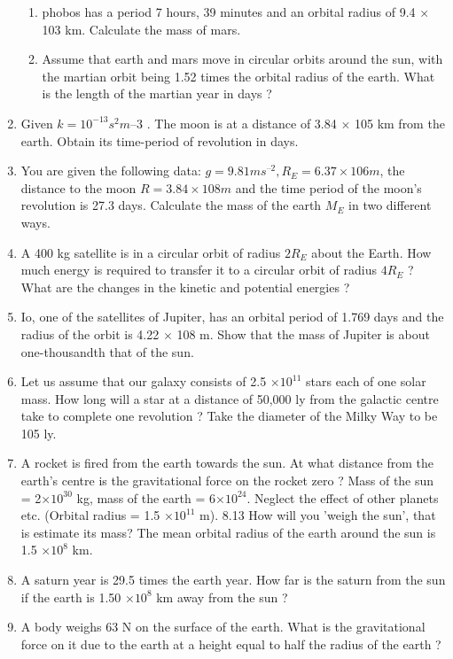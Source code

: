 \begin{enumerate}[label=\arabic*.,ref=\thesection.\theenumi]
\begin{enumerate}[label=(\alph*)]
\item  phobos has a period 7 hours, 39 minutes and an orbital radius of 9.4 $\times$103
km. Calculate the mass
of mars. 
\item  Assume that earth and mars move in circular orbits around the sun, with the martian orbit being 1.52 times the orbital radius of the earth. What is the length of the martian year in days ?
\end{enumerate}
\item Given $k = 10^{-13} s^2 m–3 $
. The moon is at a distance of 3.84 $\times$ 105 km from the earth. Obtain its
time-period of revolution in days.
\item You are given the following data: $g = 9.81 ms^{–2}, R_E = 6.37 \times 106
 m$, the distance to the moon $R = 3.84 \times 108 m$  and the time period of the 
moon’s revolution is 27.3 days. Calculate the mass of the earth $M_E$ in two different ways.
\item A 400 kg satellite is in a circular orbit of radius $2R_E$
about the Earth. How much
energy is required to transfer it to a circular orbit of radius $4R_E$
? What are the changes in the kinetic and potential energies ?
\item Io, one of the satellites of Jupiter, has an orbital period of 1.769 days and the radius of the orbit is 4.22 $\times$ 108
m. Show that the mass of Jupiter is about one-thousandth that of the sun.
\item  Let us assume that our galaxy consists of 2.5 $\times 10^{11}$ stars each of one solar mass. How 
long will a star at a distance of 50,000 ly from the galactic centre take to complete one revolution ? Take the diameter of the Milky Way to be 105 ly.
\item A rocket is fired from the earth towards the sun. At what distance from the earth’s centre is the gravitational force on the rocket zero ? Mass of the sun = 2$\times 10^{30}$ kg,
mass of the earth = 6$\times 10^{24}$.  Neglect the effect of other planets etc.  (Orbital radius =  1.5 $\times 10^{11}$
m).
8.13 How will you 'weigh the sun', that is estimate its mass? The mean orbital radius of the earth around the sun is 1.5 $\times 10^8$
km.
\item A saturn year is 29.5 times the earth year. How far is the saturn from the sun if the earth is 1.50 $\times 10^8$ km away from the sun ?
\item  A body weighs 63 N on the surface of the earth. What is the gravitational force on it due to the earth at a height equal to half the radius of the earth ?

\end{enumerate}
